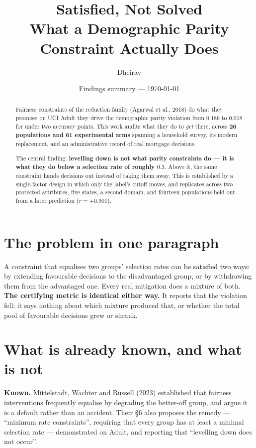 \documentclass[11pt,a4paper]{article}
\title{\textbf{Satisfied, Not Solved}\\[2mm]
\large What a Demographic Parity Constraint Actually Does}
\author{Dheirav}
\date{Findings summary --- \today}
\newcommand{\claim}[1]{\medskip\noindent\textbf{#1}\quad}
\begin{document}
\maketitle

\begin{abstract}
\noindent Fairness constraints of the reduction family (Agarwal et al., 2018) do what they
promise: on UCI Adult they drive the demographic parity violation from $0.186$ to $0.018$
for under two accuracy points. This work audits what they do to \emph{get} there, across
\textbf{26 populations and 61 experimental arms} spanning a household survey, its modern
replacement, and an administrative record of real mortgage decisions.

The central finding: \textbf{levelling down is not what parity constraints do --- it is what
they do below a selection rate of roughly $0.3$}. Above it, the same constraint hands
decisions out instead of taking them away. This is established by a single-factor design in
which only the label's cutoff moves, and replicates across two protected attributes, five
states, a second domain, and fourteen populations held out from a later prediction
($r = +0.901$).
\end{abstract}

\section{The problem in one paragraph}

A constraint that equalises two groups' selection rates can be satisfied two ways: by
extending favourable decisions to the disadvantaged group, or by withdrawing them from the
advantaged one. Every real mitigation does a mixture of both. \textbf{The certifying metric
is identical either way.} It reports that the violation fell; it says nothing about which
mixture produced that, or whether the total pool of favourable decisions grew or shrank.

\section{What is already known, and what is not}

\claim{Known.} Mittelstadt, Wachter and Russell (2023) established that fairness
interventions frequently equalise by degrading the better-off group, and argue it is a
default rather than an accident. Their \S6 also proposes the remedy --- ``minimum rate
constraints'', requiring that every group has at least a minimal selection rate ---
demonstrated on Adult, and reporting that ``levelling down does not occur''.
\end{document}

